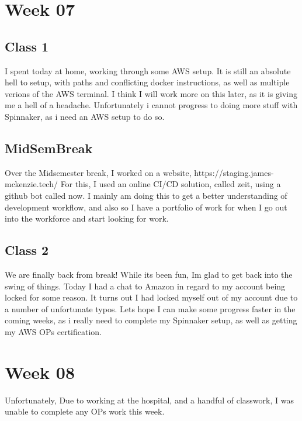 \documentclass{article}
\begin{document}
\section{Week 07}
\subsection{Class 1}
I spent today at home, working through some AWS setup. It is still an absolute hell to setup, with paths and conflicting docker instructions, 
as well as multiple verions of the AWS terminal. I think I will work more on this later, as it is giving me a hell of a headache. Unfortunately
i cannot progress to doing more stuff with Spinnaker, as i need an AWS setup to do so.
\subsection*{MidSemBreak}
Over the Midsemester break, I worked on a website, https://staging.james-mckenzie.tech/ For this, I used an online CI/CD solution,
called zeit, using a github bot called now. I mainly am doing this to get a better understanding of development workflow, and also so I
have a portfolio of work for when I go out into the workforce and start looking for work.
\subsection{Class 2}
We are finally back from break! While its been fun, Im glad to get back into the swing of things. Today I had a chat to
Amazon in regard to my account being locked for some reason. It turns out I had locked myself out of my account due to a number
of unfortunate typos. Lets hope I can make some progress faster in the coming weeks, as i really need to complete my Spinnaker setup,
as well as getting my AWS OPs certification. 

\section{Week 08}
Unfortunately, Due to working at the hospital, and a handful of classwork, I was unable to complete any OPs work this week. 
\end{document}
